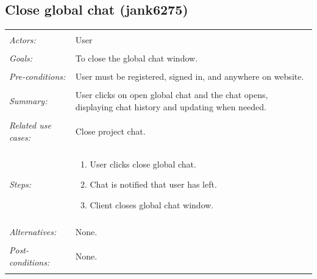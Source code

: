 \documentclass[11pt]{report}
\begin{document}
\begin{IDE-like Features}
\begin{}
\begin{Collaborative features that would be "nice":}
\subsection{Close global chat (jank6275)}
\begin{tabular}{ p{2cm} p{12cm} }
 \hline
 \\
 \textit{Actors:} & User \\ 
 \\
 \textit{Goals:} & To close the global chat window. \\
 \\
 \textit{Pre-conditions:} & User must be registered, signed in, and anywhere on website.  \\
 \\
 \textit{Summary:} & User clicks on open global chat and the chat opens, displaying chat history and updating when needed. \\ 
 \\
 \textit{Related use cases:} & Close project chat. \\ 
 \\
 \textit{Steps:} & \begin{enumerate}
  \item User clicks close global chat.
  \item Chat is notified that user has left.
  \item Client closes global chat window.
 \end{enumerate} \\
 \\
 \textit{Alternatives:} & None. \\
 \\
 \textit{Post-conditions:} & None. \\
 \\
\hline
\end{tabular}


\end{Collaborative features that would be "nice":}
\end{}
\end{IDE-like Features}
\end{document}
